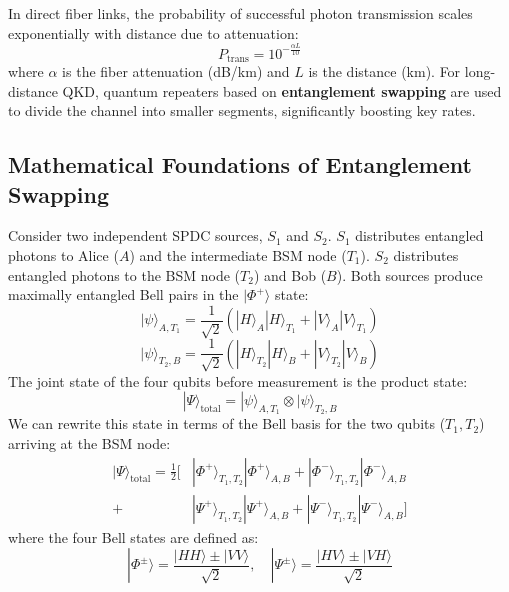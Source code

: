 \documentclass[12pt,oneside,letterpaper,english]{article}
\begin{document}
In direct fiber links, the probability of successful photon transmission scales exponentially with distance due to attenuation:
\begin{equation}
    P_{\text{trans}} = 10^{-\frac{\alpha L}{10}}
\end{equation}
where $\alpha$ is the fiber attenuation (dB/km) and $L$ is the distance (km). For long-distance QKD, quantum repeaters based on \textbf{entanglement swapping} are used to divide the channel into smaller segments, significantly boosting key rates.

\subsection{Mathematical Foundations of Entanglement Swapping}

Consider two independent SPDC sources, $S_1$ and $S_2$. $S_1$ distributes entangled photons to Alice ($A$) and the intermediate BSM node ($T_1$). $S_2$ distributes entangled photons to the BSM node ($T_2$) and Bob ($B$). Both sources produce maximally entangled Bell pairs in the $|\Phi^+\rangle$ state:
\begin{equation}
    |\psi\rangle_{A,T_1} = \frac{1}{\sqrt{2}} \left(|H\rangle_A |H\rangle_{T_1} + |V\rangle_A |V\rangle_{T_1}\right)
\end{equation}
\begin{equation}
    |\psi\rangle_{T_2,B} = \frac{1}{\sqrt{2}} \left(|H\rangle_{T_2} |H\rangle_B + |V\rangle_{T_2} |V\rangle_B\right)
\end{equation}
The joint state of the four qubits before measurement is the product state:
\begin{equation}
    |\Psi\rangle_{\text{total}} = |\psi\rangle_{A,T_1} \otimes |\psi\rangle_{T_2,B}
\end{equation}
We can rewrite this state in terms of the Bell basis for the two qubits ($T_1, T_2$) arriving at the BSM node:
\begin{align}
    |\Psi\rangle_{\text{total}} = \frac{1}{2} \Big[ 
        &|\Phi^+\rangle_{T_1,T_2} |\Phi^+\rangle_{A,B} + |\Phi^-\rangle_{T_1,T_2} |\Phi^-\rangle_{A,B} \nonumber\\
      + &|\Psi^+\rangle_{T_1,T_2} |\Psi^+\rangle_{A,B} + |\Psi^-\rangle_{T_1,T_2} |\Psi^-\rangle_{A,B}
    \Big]
\end{align}
where the four Bell states are defined as:
\begin{equation}
    |\Phi^\pm\rangle = \frac{|HH\rangle \pm |VV\rangle}{\sqrt{2}}, \quad |\Psi^\pm\rangle = \frac{|HV\rangle \pm |VH\rangle}{\sqrt{2}}
\end{equation}
\end{document}
